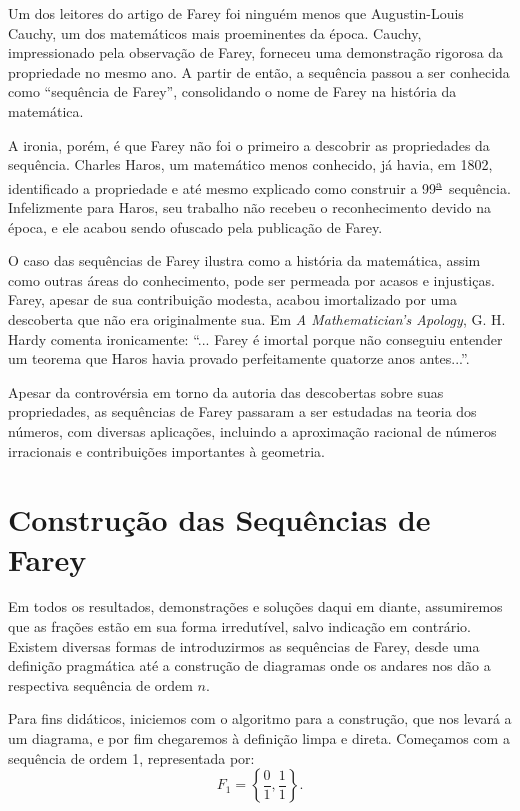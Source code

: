 \documentclass{hipatia}
\theoremstyle{definition} %
\newcommand{\superau}{\textsuperscript{\underline{a}}~}
\begin{document}
Um dos leitores do artigo de Farey foi ninguém menos que Augustin-Louis Cauchy, um dos matemáticos mais proeminentes da época. Cauchy, impressionado pela observação de Farey, forneceu uma demonstração rigorosa da propriedade no mesmo ano. A partir de então, a sequência passou a ser conhecida como ``sequência de Farey'', consolidando o nome de Farey na história da matemática.

A ironia, porém, é que Farey não foi o primeiro a descobrir as propriedades da sequência. Charles Haros, um matemático menos conhecido, já havia, em 1802, identificado a propriedade e até mesmo explicado como construir a 99\superau sequência. Infelizmente para Haros, seu trabalho não recebeu o reconhecimento devido na época, e ele acabou sendo ofuscado pela publicação de Farey.

O caso das sequências de Farey ilustra como a história da matemática, assim como outras áreas do conhecimento, pode ser permeada por acasos e injustiças. Farey, apesar de sua contribuição modesta, acabou imortalizado por uma descoberta que não era originalmente sua. Em \textit{A Mathematician's Apology}, G. H. Hardy comenta ironicamente: ``... Farey é imortal porque não conseguiu entender um teorema que Haros havia provado perfeitamente quatorze anos antes...''.

Apesar da controvérsia em torno da autoria das descobertas sobre suas propriedades, as sequências de Farey passaram a ser estudadas na teoria dos números, com diversas aplicações, incluindo a aproximação racional de números irracionais e contribuições importantes à geometria. 



\section{Construção das Sequências de Farey}

Em todos os resultados, demonstrações e soluções daqui em diante, assumiremos que as frações estão em sua forma irredutível, salvo indicação em contrário. Existem diversas formas de introduzirmos as sequências de Farey, desde uma definição pragmática até a construção de diagramas onde os andares nos dão a respectiva sequência de ordem $n$.

Para fins didáticos, iniciemos com o algoritmo para a construção, que nos levará a um diagrama, e por fim chegaremos à definição limpa e direta. Começamos com a sequência de ordem 1, representada por:
\[
F_1 = \left\{ \frac{0}{1}, \frac{1}{1} \right\}.
\]
\end{document}

